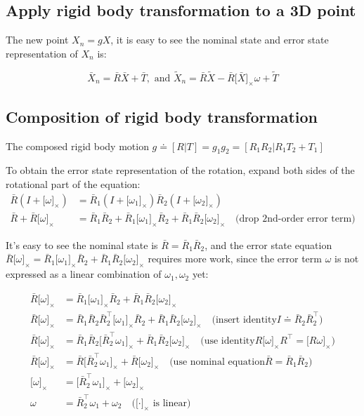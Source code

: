 \documentclass[letter,10pt]{article}
\newcommand{\asym}[1]{{\lbrack #1\rbrack}_\times{}}
\begin{document}
\subsection{Apply rigid body transformation to a 3D point}

The new point $X_n=gX$, it is easy to see the nominal state and error state representation of $X_n$ is:

$$
\bar X_n = \bar R \bar X + \bar T, \text{ and } \tilde X_n = \bar R\tilde X - \bar R\asym{\bar X}\omega + \tilde T
$$

\subsection{Composition of rigid body transformation}

The composed rigid body motion $g\doteq [R|T] = g_1 g_2=[R_1 R_2|R_1 T_2 + T_1]$

To obtain the error state representation of the rotation, expand both sides of the rotational part of the equation:
\begin{align}
    \bar R (I+\asym{\omega}) &= \bar R_1(I+\asym{\omega_1})\bar R_2(I+\asym{\omega_2}) \\
    \bar R + \bar R\asym{\omega} &= \bar R_1 \bar R_2 + \bar R_1\asym{\omega_1}\bar R_2 + \bar R_1 \bar R_2 \asym{\omega_2}\quad\text{(drop 2nd-order error term)}
\end{align}

It's easy to see the nominal state is $\bar R = \bar R_1 \bar R_2$, and the error state equation $\bar R\asym{\omega}=\bar R_1\asym{\omega_1}\bar R_2 + \bar R_1 \bar R_2 \asym{\omega_2}$ requires more work, since the error term $\omega$ is not expressed as a linear combination of $\omega_1, \omega_2$ yet:

\begin{align}
    \bar R \asym{\omega} &= \bar R_1\asym{\omega_1}\bar R_2 + \bar R_1 \bar R_2 \asym{\omega_2} \\
    \bar R \asym{\omega} &= \bar R_1 \bar R_2 \bar R_2^\top\asym{\omega_1}\bar R_2 + \bar R_1 \bar R_2 \asym{\omega_2}\quad\text{(insert identity} I\doteq \bar R_2\bar R_2^\top \text{)}\\
    \bar R \asym{\omega} &= \bar R_1 \bar R_2 \asym{\bar R_2^\top\omega_1} + \bar R_1 \bar R_2 \asym{\omega_2}\quad\text{(use identity} R\asym{\omega}R^\top=\asym{R \omega} \text{)} \\
    \bar R \asym{\omega} &= \bar R \asym{\bar R_2^\top\omega_1} + \bar R\asym{\omega_2}\quad\text{(use nominal equation} \bar R=\bar R_1 \bar R_2 \text{)} \\
    \asym{\omega} &= \asym{\bar R_2^\top \omega_1} + \asym{\omega_2} \\
    \omega &= \bar R_2^\top \omega_1 + \omega_2\quad\text{(}\asym{\cdot}\text{ is linear)}
\end{align}
\end{document}
